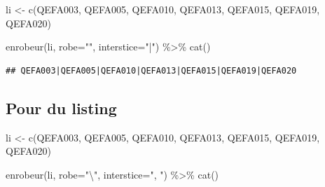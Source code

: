 \documentclass[
]{book}
\newenvironment{Shaded}{\begin{snugshade}}{\end{snugshade}}
\newcommand{\AttributeTok}[1]{\textcolor[rgb]{0.77,0.63,0.00}{#1}}
\newcommand{\FunctionTok}[1]{\textcolor[rgb]{0.00,0.00,0.00}{#1}}
\newcommand{\NormalTok}[1]{#1}
\newcommand{\OtherTok}[1]{\textcolor[rgb]{0.56,0.35,0.01}{#1}}
\newcommand{\SpecialCharTok}[1]{\textcolor[rgb]{0.00,0.00,0.00}{#1}}
\newcommand{\StringTok}[1]{\textcolor[rgb]{0.31,0.60,0.02}{#1}}
\begin{document}
\begin{Shaded}
\begin{Highlighting}[]
\NormalTok{li }\OtherTok{\textless{}{-}} \FunctionTok{c}\NormalTok{(}\StringTok{\textquotesingle{}QEFA003\textquotesingle{}}\NormalTok{, }\StringTok{\textquotesingle{}QEFA005\textquotesingle{}}\NormalTok{, }\StringTok{\textquotesingle{}QEFA010\textquotesingle{}}\NormalTok{, }\StringTok{\textquotesingle{}QEFA013\textquotesingle{}}\NormalTok{, }\StringTok{\textquotesingle{}QEFA015\textquotesingle{}}\NormalTok{, }\StringTok{\textquotesingle{}QEFA019\textquotesingle{}}\NormalTok{, }\StringTok{\textquotesingle{}QEFA020\textquotesingle{}}\NormalTok{)}

\FunctionTok{enrobeur}\NormalTok{(li, }\AttributeTok{robe=}\StringTok{""}\NormalTok{, }\AttributeTok{interstice=}\StringTok{"|"}\NormalTok{) }\SpecialCharTok{\%\textgreater{}\%} \FunctionTok{cat}\NormalTok{()}
\end{Highlighting}
\end{Shaded}

\begin{verbatim}
## QEFA003|QEFA005|QEFA010|QEFA013|QEFA015|QEFA019|QEFA020
\end{verbatim}

\hypertarget{pour-du-listing}{%
\subsection{Pour du listing}\label{pour-du-listing}}

\begin{Shaded}
\begin{Highlighting}[]
\NormalTok{li }\OtherTok{\textless{}{-}} \FunctionTok{c}\NormalTok{(}\StringTok{\textquotesingle{}QEFA003\textquotesingle{}}\NormalTok{, }\StringTok{\textquotesingle{}QEFA005\textquotesingle{}}\NormalTok{, }\StringTok{\textquotesingle{}QEFA010\textquotesingle{}}\NormalTok{, }\StringTok{\textquotesingle{}QEFA013\textquotesingle{}}\NormalTok{, }\StringTok{\textquotesingle{}QEFA015\textquotesingle{}}\NormalTok{, }\StringTok{\textquotesingle{}QEFA019\textquotesingle{}}\NormalTok{, }\StringTok{\textquotesingle{}QEFA020\textquotesingle{}}\NormalTok{)}

\FunctionTok{enrobeur}\NormalTok{(li, }\AttributeTok{robe=}\StringTok{"}\SpecialCharTok{\textbackslash{}\textquotesingle{}}\StringTok{"}\NormalTok{, }\AttributeTok{interstice=}\StringTok{", "}\NormalTok{) }\SpecialCharTok{\%\textgreater{}\%} \FunctionTok{cat}\NormalTok{()}
\end{Highlighting}
\end{Shaded}
\end{document}
